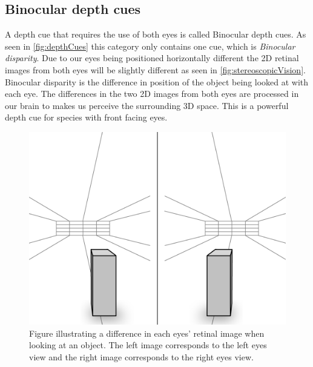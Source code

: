 \subsection{Binocular depth cues}
A depth cue that requires the use of both eyes is called Binocular depth cues. As seen in \autoref{fig:depthCues} this category only contains one cue, which is \textit{Binocular disparity}. Due to our eyes being positioned horizontally different the 2D retinal images from both eyes will be slightly different as seen in \autoref{fig:stereoscopicVision}. Binocular disparity is the difference in position of the object being looked at with each eye\citep{sensationPerception}. The differences in the two 2D images from both eyes are processed in our brain to makes us perceive the surrounding 3D space. This is a powerful depth cue for species with front facing eyes\citep{seeingInThreeDimensions}.
\begin{figure}[H]
	\centering
	\includegraphics[width=0.8\linewidth]{figure/Analysis/stereoScopicVision.png}
	\caption{Figure illustrating a difference in each eyes' retinal image when looking at an object. The left image corresponds to the left eyes view and the right image corresponds to the right eyes view.}
	\label{fig:stereoscopicVision}
\end{figure}


